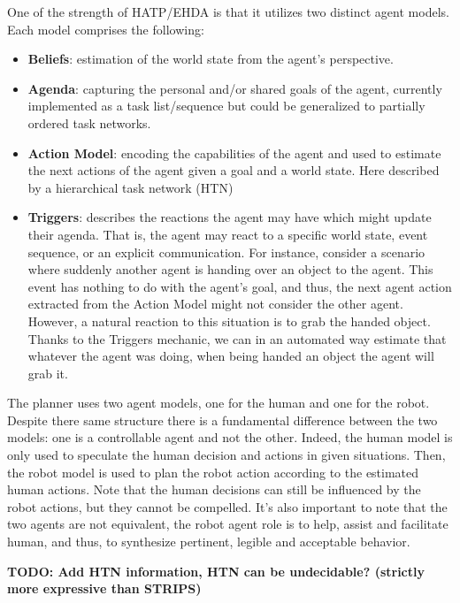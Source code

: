 One of the strength of HATP/EHDA is that it utilizes two distinct agent models. Each model comprises the following:
\begin{itemize}
    \item \textbf{Beliefs}: estimation of the world state from the agent's perspective.
    
    \item \textbf{Agenda}: capturing the personal and/or shared goals of the agent, currently implemented as a task list/sequence but could be generalized to partially ordered task networks.
    
    \item \textbf{Action Model}: encoding the capabilities of the agent and used to estimate the next actions of the agent given a goal and a world state. Here described by a hierarchical task network (HTN)
    
    \item \textbf{Triggers}: describes the reactions the agent may have which might update their agenda. That is, the agent may react to a specific world state, event sequence, or an explicit communication. For instance,  consider a scenario where suddenly another agent is handing over an object to the agent. This event has nothing to do with the agent's goal, and thus, the next agent action extracted from the Action Model might not consider the other agent. However, a natural reaction to this situation is to grab the handed object. Thanks to the Triggers mechanic, we can in an automated way estimate that whatever the agent was doing, when being handed an object the agent will grab it.  

\end{itemize}

The planner uses two agent models, one for the human and one for the robot. Despite there same structure there is a fundamental difference between the two models: one is a controllable agent and not the other. Indeed, the human model is only used to speculate the human decision and actions in given situations. 
Then, the robot model is used to plan the robot action according to the estimated human actions.
Note that the human decisions can still be influenced by the robot actions, but they cannot be compelled.
It's also important to note that the two agents are not equivalent, the robot agent role is to help, assist and facilitate human, and thus, to synthesize pertinent, legible and acceptable behavior.


\textbf{TODO: Add HTN information, HTN can be undecidable? (strictly more expressive than STRIPS)}

